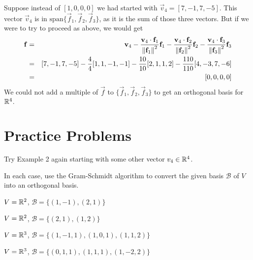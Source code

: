 \documentclass{ximera}
\begin{document}
\begin{remark}\label{rem:vectorInSpan}
Suppose instead of $[1,0,0,0]$ we had started with $\vec{v}_4 = [7, -1, 7, -5]$.  This vector $\vec{v}_4$ is in $\mbox{span}\{\vec{f}_1, \vec{f}_2, \vec{f}_3\}$, as it is the sum of those three vectors.  But if we were to try to proceed as above, we would get 
  \begin{eqnarray*}
      \mathbf{f} &=& \mathbf{v}_{4} - \frac{\mathbf{v}_{4} \cdot \mathbf{f}_{1}}{\left\lVert\mathbf{f}_{1}\right\rVert^2}\mathbf{f}_{1} - \frac{\mathbf{v}_{4} \cdot \mathbf{f}_{2}}{\left\lVert\mathbf{f}_{2}\right\rVert^2}\mathbf{f}_{2} - \frac{\mathbf{v}_{4} \cdot \mathbf{f}_{3}}{\left\lVert\mathbf{f}_{3}\right\rVert^2}\mathbf{f}_{3} \\
      &=& [7, -1, 7, -5] - \frac{4}{4}[1, 1, -1, -1] - \frac{10}{10}[2, 1, 1, 2] - \frac{110}{110}[4, -3, 7, -6] \\
      &=&[0,0,0,0]
  \end{eqnarray*}
We could not add a multiple of $\vec{f}$ to $\{\vec{f}_1, \vec{f}_2, \vec{f}_3\}$ to get an orthogonal basis for $\mathbb{R}^4$.
\end{remark}

\section*{Practice Problems}

\begin{problem}\label{prob:extend}

    \item Try Example 2 again starting with some other vector $v_4 \in \mathbb{R}^4$.

\end{problem}

\begin{problem}\label{GS}
In each case, use the Gram-Schmidt algorithm to convert the given basis $\mathcal{B}$ of $V$ into an orthogonal basis.  

\begin{problem}\label{GS1}
$V = \mathbb{R}^2$, $\mathcal{B} = \{(1, -1), (2, 1)\}$
\end{problem}
\begin{problem}
$V = \mathbb{R}^2$, $\mathcal{B} = \{(2, 1), (1, 2)\}$
\end{problem}
\begin{problem}
$V = \mathbb{R}^3$, $\mathcal{B} = \{(1, -1, 1), (1, 0, 1), (1, 1, 2)\}$

\end{problem}
\begin{problem}
$V = \mathbb{R}^3$, $\mathcal{B} = \{(0, 1, 1), (1, 1, 1), (1, -2, 2)\}$
\end{problem}
\end{problem}
\end{document}
